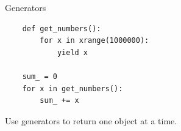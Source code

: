 \documentclass[t,handout]{beamer}
\begin{document}
\begin{frame}[c,fragile]{Generators}

\begin{verbatim}
    def get_numbers():
        for x in xrange(1000000):
            yield x
    
    sum_ = 0
    for x in get_numbers():
        sum_ += x
\end{verbatim}

Use generators to return one object at a time.
 

\end{frame}
\end{document}
